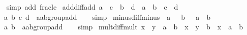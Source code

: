 \begin{isabellebody}
\isadelimproof
\ \ %
\endisadelimproof
%
\isatagproof
{}\isamarkupfalse%
\ {\isacharparenleft}{\kern0pt}simp\ add{\isacharcolon}{\kern0pt}\ frac{\isacharunderscore}{\kern0pt}le{\isacharparenright}{\kern0pt}%
\endisatagproof
{\isafoldproof}%
%
\isadelimproof
\isanewline
%
\endisadelimproof
\isanewline
{}\isamarkupfalse%
\ add{\isacharunderscore}{\kern0pt}diff{\isacharunderscore}{\kern0pt}add{\isacharcolon}{\kern0pt}\ {\isachardoublequoteopen}{\isacharparenleft}{\kern0pt}a\ {\isacharplus}{\kern0pt}\ c{\isacharparenright}{\kern0pt}\ {\isacharminus}{\kern0pt}\ {\isacharparenleft}{\kern0pt}b\ {\isacharplus}{\kern0pt}\ d{\isacharparenright}{\kern0pt}\ {\isacharequal}{\kern0pt}\ {\isacharparenleft}{\kern0pt}a\ {\isacharminus}{\kern0pt}\ b{\isacharparenright}{\kern0pt}\ {\isacharplus}{\kern0pt}\ {\isacharparenleft}{\kern0pt}c\ {\isacharminus}{\kern0pt}\ d{\isacharparenright}{\kern0pt}{\isachardoublequoteclose}\isanewline
\ \ \ a\ b\ c\ d\ {\isacharcolon}{\kern0pt}{\isacharcolon}{\kern0pt}\ {\isachardoublequoteopen}{\isacharprime}{\kern0pt}a{\isacharcolon}{\kern0pt}{\isacharcolon}{\kern0pt}ab{\isacharunderscore}{\kern0pt}group{\isacharunderscore}{\kern0pt}add{\isachardoublequoteclose}\isanewline
%
\isadelimproof
\ \ %
\endisadelimproof
%
\isatagproof
{}\isamarkupfalse%
\ simp%
\endisatagproof
{\isafoldproof}%
%
\isadelimproof
\isanewline
%
\endisadelimproof
\isanewline
{}\isamarkupfalse%
\ minus{\isacharunderscore}{\kern0pt}diff{\isacharunderscore}{\kern0pt}minus{\isacharcolon}{\kern0pt}\ {\isachardoublequoteopen}{\isacharminus}{\kern0pt}\ a\ {\isacharminus}{\kern0pt}\ {\isacharminus}{\kern0pt}\ b\ {\isacharequal}{\kern0pt}\ {\isacharminus}{\kern0pt}\ {\isacharparenleft}{\kern0pt}a\ {\isacharminus}{\kern0pt}\ b{\isacharparenright}{\kern0pt}{\isachardoublequoteclose}\isanewline
\ \ \ a\ b\ {\isacharcolon}{\kern0pt}{\isacharcolon}{\kern0pt}\ {\isachardoublequoteopen}{\isacharprime}{\kern0pt}a{\isacharcolon}{\kern0pt}{\isacharcolon}{\kern0pt}ab{\isacharunderscore}{\kern0pt}group{\isacharunderscore}{\kern0pt}add{\isachardoublequoteclose}\isanewline
%
\isadelimproof
\ \ %
\endisadelimproof
%
\isatagproof
{}\isamarkupfalse%
\ simp%
\endisatagproof
{\isafoldproof}%
%
\isadelimproof
\isanewline
%
\endisadelimproof
\isanewline
{}\isamarkupfalse%
\ mult{\isacharunderscore}{\kern0pt}diff{\isacharunderscore}{\kern0pt}mult{\isacharcolon}{\kern0pt}\ {\isachardoublequoteopen}{\isacharparenleft}{\kern0pt}x\ {\isacharasterisk}{\kern0pt}\ y\ {\isacharminus}{\kern0pt}\ a\ {\isacharasterisk}{\kern0pt}\ b{\isacharparenright}{\kern0pt}\ {\isacharequal}{\kern0pt}\ x\ {\isacharasterisk}{\kern0pt}\ {\isacharparenleft}{\kern0pt}y\ {\isacharminus}{\kern0pt}\ b{\isacharparenright}{\kern0pt}\ {\isacharplus}{\kern0pt}\ {\isacharparenleft}{\kern0pt}x\ {\isacharminus}{\kern0pt}\ a{\isacharparenright}{\kern0pt}\ {\isacharasterisk}{\kern0pt}\ b{\isachardoublequoteclose}\isanewline

\end{isabellebody}
